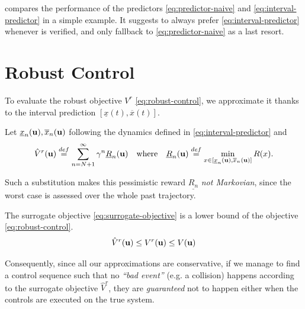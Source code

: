 \documentclass{article}
\begin{document}
 compares the performance of the predictors \eqref{eq:predictor-naive} and \eqref{eq:interval-predictor} in a simple example. It suggests to always prefer \eqref{eq:interval-predictor} whenever  is verified, and only fallback to \eqref{eq:predictor-naive} as a last resort.

\section{Robust Control}

\label{sec:control}
To evaluate the robust objective $V^r$ \eqref{eq:robust-control}, we approximate it thanks to the interval prediction $[\underline{x}(t), \overline{x}(t)]$.

\begin{definition}
	Let $\underline{x}_n(\mathbf{u}), \overline{x}_n(\mathbf{u})$ following the dynamics defined in \eqref{eq:interval-predictor} and
\begin{equation}
\label{eq:surrogate-objective} 
\hat{V}^r(\bu) \eqdef \sum_{n=N+1}^\infty \gamma^n \underline{R}_n(\bu)\quad\text{where}\quad\underline{R}_n(\bu) \eqdef \min_{x\in[\underline{x}_n(\bu), \overline{x}_n(\bu)]}  R(x). %
\end{equation}
\end{definition}
Such a substitution makes this pessimistic reward $\underline{R_n}$ \emph{not Markovian}, since the worst case is assessed over the whole past trajectory.

\begin{theorem}
\label{prop:lower-bound}
The surrogate objective  \eqref{eq:surrogate-objective} is a lower bound of the objective  \eqref{eq:robust-control}.
\begin{equation*}
\hat{V}^r(\mathbf{u}) \leq V^r(\mathbf{u}) \leq V(\mathbf{u})
\end{equation*}
\end{theorem}
Consequently, since all our approximations are conservative, if we manage to find a control sequence such that no \textit{``bad event''} (e.g. a collision) happens according to the surrogate objective $\hat{V}^r$, they are \emph{guaranteed} not to happen either when the controls are executed on the true system. 
\end{document}
